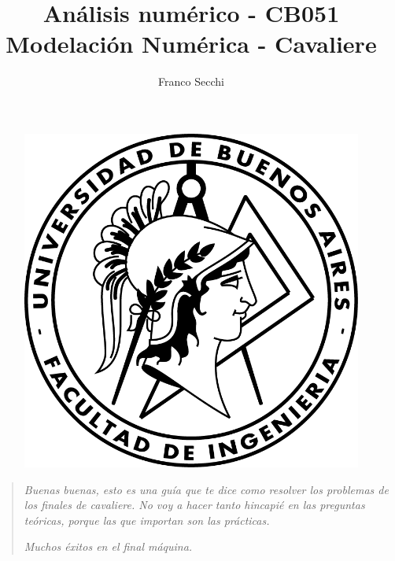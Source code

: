 \documentclass{style}
\begin{document}
	
	\begin{figure}
		\centering
		\includegraphics[scale=1.2]{logo_fiuba.png}
		\label{fig:FIUBA}
	\end{figure}
	
	\title{Análisis numérico - CB051 Modelación Numérica - Cavaliere}
	\author{Franco Secchi}
	\maketitle
    	
	\renewcommand{\contentsname}{Contenidos} 
	\begin{quote}
         \textit{Buenas buenas, esto es una guía que te dice como resolver los problemas de los finales de cavaliere. No voy a hacer tanto hincapié en las preguntas teóricas, porque las que importan son las prácticas.}
         
        \textit{Muchos éxitos en el final máquina.}
        
    \end{quote}
	\tableofcontents
    
    \FloatBarrier
    
    \FloatBarrier
    
    \FloatBarrier
    
\end{document}
